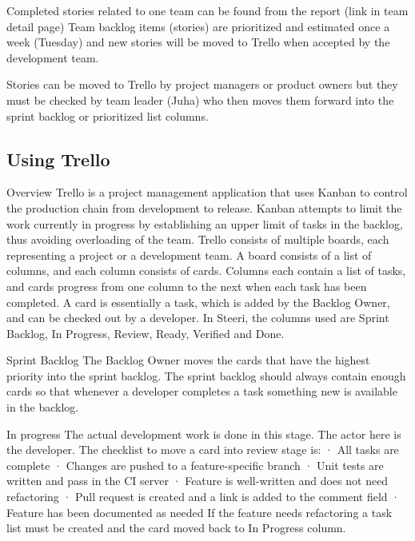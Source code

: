 \documentclass[english]{tktltiki2}
\theoremstyle{definition}
\theoremstyle{remark}
\begin{document}
Completed stories related to one team can be found from the report (link in team detail page)
Team backlog items (stories) are prioritized and estimated once a week (Tuesday) and new stories will be moved to Trello when accepted by the development team.

Stories can be moved to Trello by project managers or product owners but they must be checked by team leader (Juha) who then moves them forward into the sprint backlog or prioritized list columns.

\subsection{Using Trello}

Overview
Trello is a project management application that uses Kanban to control the production chain from development to release. Kanban attempts to limit the work currently in progress by establishing an upper limit of tasks in the backlog, thus avoiding overloading of the team. Trello consists of multiple boards, each representing a project or a development team. A board consists of a list of columns, and each column consists of cards. Columns each contain a list of tasks, and cards progress from one column to the next when each task has been completed. A card is essentially a task, which is added by the Backlog Owner, and can be checked out by a developer. In Steeri, the columns used are Sprint Backlog, In Progress, Review, Ready, Verified and Done. 

Sprint Backlog
The Backlog Owner moves the cards that have the highest priority into the sprint backlog. The sprint backlog should always contain enough cards so that whenever a developer completes a task something new is available in the backlog.

In progress
The actual development work is done in this stage. The actor here is the developer. The checklist to move a card into review stage is:
·       All tasks are complete
·       Changes are pushed to a feature-specific branch
·       Unit tests are written and pass in the CI server
·       Feature is well-written and does not need refactoring
·       Pull request is created and a link is added to the comment field
·       Feature has been documented as needed
If the feature needs refactoring a task list must be created and the card moved back to In Progress column.
\end{document}
